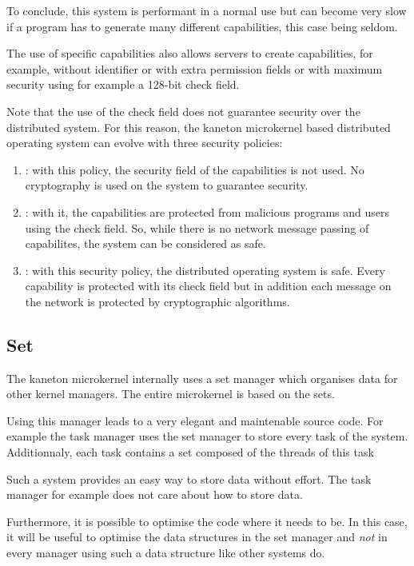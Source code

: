 \begin{multicols}{2}
To conclude, this system is performant in a normal use but can become
very slow if a program has to generate many different capabilities, this
case being seldom.

The use of specific capabilities also allows servers to create capabilities,
for example, without identifier or with extra permission fields or with
maximum security using for example a 128-bit check field.

Note that the use of the check field does not guarantee security over the
distributed system. For this reason, the kaneton microkernel based
distributed operating system can evolve with three security policies:

\begin{enumerate}
  \item
    : with this policy, the security field of the
    capabilities is not used. No cryptography is used on the system
    to guarantee security.
  \item
    : with it, the capabilities are protected from
    malicious programs and users using the check field. So, while there
    is no network message passing of capabilites, the system can be
    considered as safe.
  \item
    : with this security policy, the distributed
    operating system is safe. Every capability is protected with its check
    field but in addition each message on the network is protected by
    cryptographic algorithms.
\end{enumerate}

%
%

\subsection{Set}

The kaneton microkernel internally uses a set manager which organises data
for other kernel managers. The entire microkernel is based on the sets.

Using this manager leads to a very elegant and maintenable source code. For
example the task manager uses the set manager to store every task of the
system. Additionnaly, each task contains a set composed of the threads of
this task \etc{}

Such a system provides an easy way to store data without effort. The task
manager for example does not care about how to store data.

Furthermore, it is possible to optimise the code where it needs to be. In
this case, it will be useful to optimise the data structures in the set
manager and \textit{not} in every manager using such a data structure like
other systems do.


\end{multicols}

